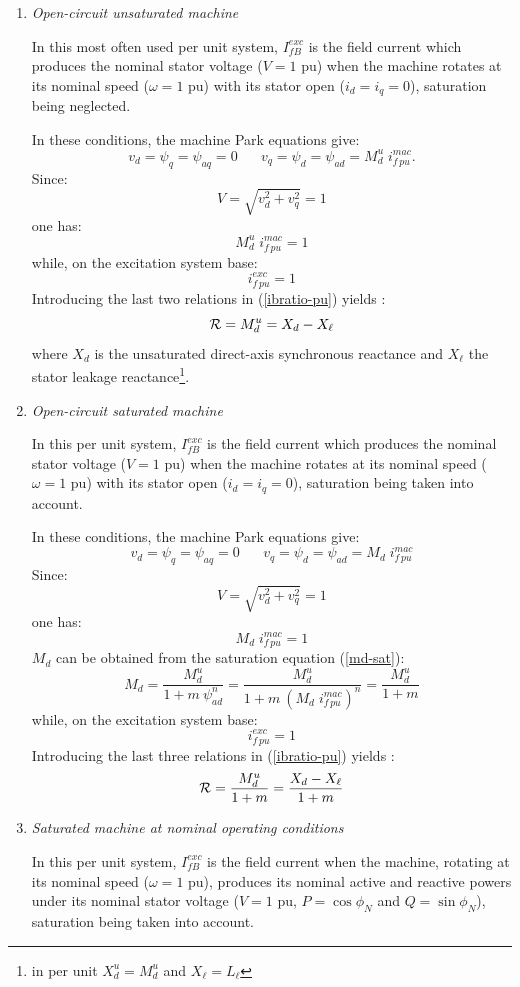 \begin{enumerate}
\item {\em Open-circuit unsaturated machine}

In this most often used per unit system, $I_{fB}^{exc}$ is the field current which produces the nominal stator voltage ($V = 1$ pu) when the machine rotates at its nominal speed ($\omega = 1$ pu) with its stator open ($i_d = i_q = 0$), saturation being neglected.

In these conditions, the machine Park equations give:
\[ v_d = \psi_q = \psi_{aq} = 0 \;\;\;\;\;\; v_q = \psi_d = \psi_{ad} = M_d^u \; i_{f\,pu}^{mac}. \]
Since:
\[ V = \sqrt{v_d^2 + v_q^2} = 1 \]
one has:
\[ M_d^u \; i_{f\,pu}^{mac} = 1 \]
while, on the excitation system base:
\[ i_{f\,pu}^{exc} = 1 \]
Introducing the last two relations in (\ref{ibratio-pu}) yields :
\begin{equation}\label{ibratio-unsat}
{\cal R} = M_d^u = X_d - X_\ell
\end{equation}
where $X_d$ is the unsaturated direct-axis synchronous reactance and $X_\ell$ the stator leakage reactance\footnote{in per unit $X_d^u = M_d^u$ and $X_\ell = L_\ell$}.

\item {\em Open-circuit saturated machine}

In this per unit system, $I_{fB}^{exc}$ is the field current which produces the nominal stator voltage ($V = 1$ pu) when the machine rotates at its nominal speed ($\omega = 1$ pu) with its stator open ($i_d = i_q = 0$), saturation being taken into account.

In these conditions, the machine Park equations give:
\[ v_d = \psi_q = \psi_{aq} = 0 \;\;\;\;\;\; v_q = \psi_d = \psi_{ad} = M_d \; i_{f\,pu}^{mac} \]
Since:
\[ V = \sqrt{v_d^2 + v_q^2} = 1 \]
one has:
\[ M_d \; i_{f\,pu}^{mac} = 1 \]
$M_d$ can be obtained from the saturation equation (\ref{md-sat}):
\[ M_d = \frac{M_d^u}{1 + m \: \psi_{ad}^n} = \frac{M_d^u}{1 + m \: ( M_d \; i_{f\,pu}^{mac} )^n} = \frac{M_d^u}{1+m} \]
while, on the excitation system base:
\[ i_{f\,pu}^{exc} = 1 \]
Introducing the last three relations in (\ref{ibratio-pu}) yields :
\begin{equation}\label{ibratio-sat}
{\cal R} = \frac{M_d^u}{1+m} = \frac{X_d - X_\ell}{1+m}
\end{equation}

\item {\em Saturated machine at nominal operating conditions}

In this per unit system, $I_{fB}^{exc}$ is the field current when the machine, rotating at its nominal speed ($\omega = 1$ pu), produces its nominal active and reactive powers under its nominal stator voltage ($V = 1$ pu, $P = \cos \phi_N$ and $Q = \sin \phi_N$), saturation being taken into account.
\end{enumerate}


